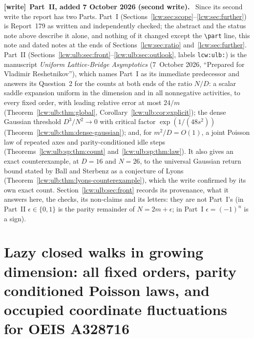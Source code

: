 \documentclass[11pt,letterpaper]{article}
\theoremstyle{remark}\newtheorem{remark}[theorem]{Remark}
\newcommand{\file}[1]{\nolinkurl{#1}}
\newenvironment{writenote}[1][]{\par\smallskip\begingroup\small
 \noindent\textbf{[write]}\if\relax\detokenize{#1}\relax\else~\textbf{#1.}\fi\ }%
 {\par\endgroup\smallskip}
\begin{document}
\begin{writenote}[Part~II, added 7 October 2026 (second write)]
Since its second write the report has two Parts. Part~I
(Sections~\ref{lcw:sec:scope}--\ref{lcw:sec:further}) is Report~179 as
written and independently checked; the abstract and the status note above
describe it alone, and nothing of it changed except the \verb|\part| line,
this note and dated notes at the ends of Sections~\ref{lcw:sec:ratio}
and~\ref{lcw:sec:further}. Part~II
(Sections~\ref{lcw:ulb:sec:front}--\ref{lcw:ulb:sec:outlook}, labels
\file{lcw:ulb:}) is the manuscript \emph{Uniform Lattice-Bridge
Asymptotics} (7~October 2026, ``Prepared for Vladimir Reshetnikov''), which
names Part~I as its immediate predecessor and answers its
Question~2 for the counts at both ends of the ratio $N/D$: a
scalar saddle expansion uniform in the dimension and in all nonnegative
activities, to every fixed order, with leading relative error at most
$24/m$ (Theorem~\ref{lcw:ulb:thm:global},
Corollary~\ref{lcw:ulb:cor:explicit}); the dense Gaussian threshold
$D^3/N^2\to0$ with critical factor $\exp(1/(48s^2))$
(Theorem~\ref{lcw:ulb:thm:dense-gaussian}); and, for $m^2/D=O(1)$, a joint
Poisson law of repeated axes and parity-conditioned idle steps
(Theorems~\ref{lcw:ulb:sp:thm:count} and~\ref{lcw:ulb:sp:thm:law}). It also
gives an exact counterexample, at $D=16$ and $N=26$, to the universal
Gaussian return bound stated by Ball and Sterbenz as a conjecture of Lyons
(Theorem~\ref{lcw:ulb:thm:lyons-counterexample}), which the write confirmed
by its own exact count. Section~\ref{lcw:ulb:sec:front} records its
provenance, what it answers here, the checks, its non-claims and its
letters: they are not Part~I's (in Part~II $\epsilon\in\{0,1\}$ is the
parity remainder of $N=2m+\epsilon$; in Part~I $\epsilon=(-1)^n$ is a sign).
\end{writenote}
\setcounter{tocdepth}{1}{\small\tableofcontents}
\newpage

\part{Lazy closed walks in growing dimension: all fixed orders, parity conditioned Poisson laws, and occupied coordinate fluctuations for OEIS A328716}\label{lcw:part:one}
\end{document}
